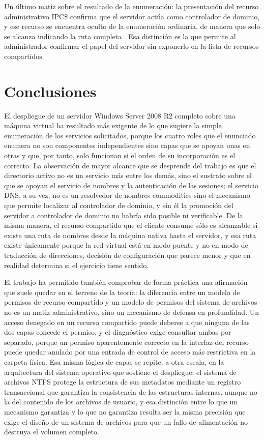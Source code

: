 \documentclass[12pt]{article}
\begin{document}
Un último matiz sobre el resultado de la enumeración: la presentación del recurso administrativo IPC\$ confirma que el servidor actúa como controlador de dominio, y ese recurso se encuentra oculto de la enumeración ordinaria, de manera que solo se alcanza indicando la ruta completa \parencite{microsoftShareNtfsPermissions}. Esa distinción es la que permite al administrador confirmar el papel del servidor sin exponerlo en la lista de recursos compartidos.

\section{Conclusiones}
\label{sec:conclusiones}

El despliegue de un servidor Windows Server 2008 R2 completo sobre una máquina virtual ha resultado más exigente de lo que sugiere la simple enumeración de los servicios solicitados, porque los cuatro roles que el enunciado enumera no son componentes independientes sino capas que se apoyan unas en otras y que, por tanto, solo funcionan si el orden de su incorporación es el correcto. La observación de mayor alcance que se desprende del trabajo es que el directorio activo no es un servicio más entre los demás, sino el sustrato sobre el que se apoyan el servicio de nombres y la autenticación de las sesiones; el servicio DNS, a su vez, no es un resolvedor de nombres commodities sino el mecanismo que permite localizar al controlador de dominio, y sin él la promoción del servidor a controlador de dominio no habría sido posible ni verificable. De la misma manera, el recurso compartido que el cliente consume sólo es alcanzable si existe una ruta de nombres desde la máquina nativa hasta el servidor, y esa ruta existe únicamente porque la red virtual está en modo puente y no en modo de traducción de direcciones, decisión de configuración que parece menor y que en realidad determina si el ejercicio tiene sentido.

El trabajo ha permitido también comprobar de forma práctica una afirmación que suele quedar en el terreno de la teoría: la diferencia entre un modelo de permisos de recurso compartido y un modelo de permisos del sistema de archivos no es un matiz administrativo, sino un mecanismo de defensa en profundidad. Un acceso denegado en un recurso compartido puede deberse a que ninguna de las dos capas concede el permiso, y el diagnóstico exige consultar ambas por separado, porque un permiso aparentemente correcto en la interfaz del recurso puede quedar anulado por una entrada de control de acceso más restrictiva en la carpeta física. Esa misma lógica de capas se repite, a otra escala, en la arquitectura del sistema operativo que sostiene el despliegue: el sistema de archivos NTFS protege la estructura de sus metadatos mediante un registro transaccional que garantiza la consistencia de las estructuras internas, aunque no la del contenido de los archivos de usuario, y esa distinción entre lo que un mecanismo garantiza y lo que no garantiza resulta ser la misma precisión que exige el diseño de un sistema de archivos para que un fallo de alimentación no destruya el volumen completo.
\end{document}
